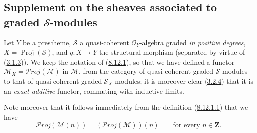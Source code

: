 \subsection{Supplement on the sheaves associated to
graded $\mathcal{S}$-modules}
\label{subsection:II.8.14}

\begin{env}[8.14.1]
\label{II.8.14.1}
Let $Y$ be a prescheme, $\mathcal{S}$ a quasi-coherent $\mathcal{O}_Y$-algebra
graded \emph{in positive degrees},
$X=\operatorname{Proj}(\mathcal{S})$, and $q:X\to Y$ the structural morphism
(separated by virtue of (\hyperref[II.3.1.3]{3.1.3})). We keep the
notation of (\hyperref[II.8.12.1]{8.12.1}), so that we have
defined a functor
$\mathcal{M}_X=\mathcal{P}\mathit{roj}(\mathcal{M})$ in $\mathcal{M}$, from the
category of quasi-coherent graded $\mathcal{S}$-modules to that of
quasi-coherent graded $\mathcal{S}_X$-modules; it is moreover clear
(\hyperref[II.3.2.4]{3.2.4}) that it is an \emph{exact additive} functor,
commuting with inductive limits.

Note moreover that it follows immediately from the definition
(\hyperref[II.8.12.1.1]{8.12.1.1}) that we have
\begin{equation}
\label{II.8.14.1.1}
  \mathcal{P}\mathit{roj}(\mathcal{M}(n))
  =(\mathcal{P}\mathit{roj}(\mathcal{M}))(n)
  \qquad\text{for every }n\in\mathbf{Z}.
\tag{8.14.1.1}
\end{equation}
\end{env}

